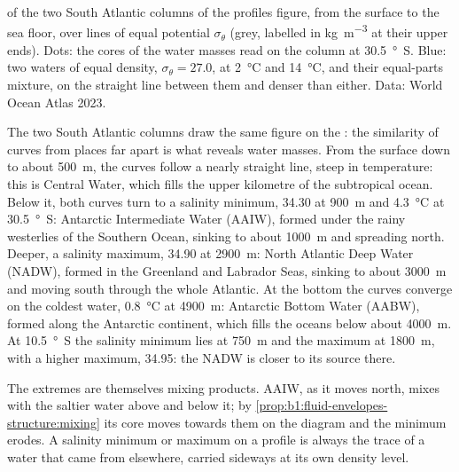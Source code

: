 \begin{omfigure}
{\small {} of the two South Atlantic columns of the profiles figure,
from the surface to the sea floor, over lines of equal potential  $\sigma_\theta$ (grey, labelled in \si{kg.m^{-3}} at their upper ends).
Dots: the cores of the water masses read on the column at \qty{30.5}{\degree
S}. Blue: two waters of equal density, $\sigma_\theta = 27.0$, at
\qty{2}{\celsius} and \qty{14}{\celsius}, and their equal-parts mixture, on the
straight line between them and denser than either. Data: World Ocean Atlas
2023.}
\label{fig:b1:fluid-envelopes-structure:ts}
\end{omfigure}

The two South Atlantic columns draw the same figure on the : the
similarity of curves from places far apart is what reveals water masses. From
the surface down to about \qty{500}{m}, the curves follow a nearly straight
line, steep in temperature: this is Central Water, which fills the upper
kilometre of the subtropical ocean. Below it, both curves turn to a salinity
minimum, \num{34.30} at \qty{900}{m} and \qty{4.3}{\celsius} at
\qty{30.5}{\degree S}: Antarctic Intermediate Water (AAIW), formed under the
rainy westerlies of the Southern Ocean, sinking to about \qty{1000}{m} and
spreading north. Deeper, a salinity maximum, \num{34.90} at \qty{2900}{m}: North
Atlantic Deep Water (NADW), formed in the Greenland and Labrador Seas, sinking to
about \qty{3000}{m} and moving south through the whole Atlantic. At the bottom
the curves converge on the coldest water, \qty{0.8}{\celsius} at
\qty{4900}{m}: Antarctic Bottom Water (AABW), formed along the Antarctic
continent, which fills the oceans below about \qty{4000}{m}. At
\qty{10.5}{\degree S} the salinity minimum lies at \qty{750}{m} and the maximum
at \qty{1800}{m}, with a higher maximum, \num{34.95}: the NADW is closer to its
source there.

The extremes are themselves mixing products. AAIW, as it moves north, mixes
with the saltier water above and below it; by \cref{prop:b1:fluid-envelopes-structure:mixing}
its core moves towards them on the diagram and the minimum erodes. A salinity
minimum or maximum on a profile is always the trace of a water that came from
elsewhere, carried sideways at its own density level.

